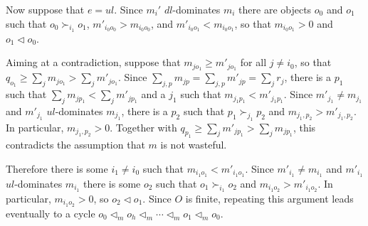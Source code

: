 \documentclass[12pt]{article}
\theoremstyle{definition}
\begin{document}
\begin{appendix}
Now suppose that $e = ul$. Since $m_i'$ $dl$-dominates $m_i$ there are objects $o_0$ and $o_1$  such that $o_0 \succ_{i_1} o_1$, $m'_{i_0o_0} > m_{i_0o_0}$, and $m'_{i_0o_1} < m_{i_0o_1}$, so that $m_{i_0o_1} > 0$ and $o_1 \lhd o_0$. 

Aiming at a contradiction, suppose that $m_{jo_1} \ge m'_{jo_1}$ for all $j \ne i_0$, so that $q_{o_1} \ge \sum_j m_{jo_1} > \sum_j m'_{jo_1}$.  Since $\sum_{j,p} m_{jp} = \sum_{j,p} m'_{jp} = \sum_j r_j$, there is a $p_1$ such that $\sum_j m_{jp_1} < \sum_j m'_{jp_1}$ and a $j_1$ such that $m_{j_1p_1} < m'_{j_1p_1}$. Since $m'_{j_1} \ne m_{j_1}$ and $m'_{j_1}$ $ul$-dominates $m_{j_1}$, there is a $p_2$ such that $p_1 \succ_{j_1} p_2$ and $m_{j_1,p_2} > m'_{j_1,p_2}$.  
In particular, $m_{j_1,p_2} > 0$.  Together with $q_{p_1} \ge \sum_j m'_{jp_1} > \sum_j m_{jp_1}$, this contradicts the assumption that $m$ is not wasteful.

Therefore there is some $i_1 \ne i_0$ such that $m_{i_1o_1} < m'_{i_1o_1}$.  Since $m'_{i_1} \ne m_{i_1}$ and $m'_{i_1}$ $ul$-dominates $m_{i_1}$ there is some $o_2$ such that $o_1 \succ_{i_1} o_2$ and $m_{i_1o_2} > m'_{i_1o_2}$.  In particular, $m_{i_1o_2} > 0$, so $o_2 \lhd o_1$.  
Since $O$ is finite, repeating this argument leads eventually to a cycle $o_0 \lhd_m o_h \lhd_m \cdots \lhd_m o_1 \lhd_m o_0$.




\end{appendix}



\end{document}
